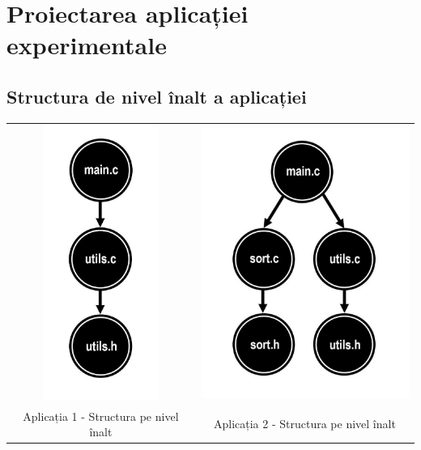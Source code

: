 \documentclass[11pt,a4paper]{article}
\begin{document}
\section{Proiectarea aplicației experimentale}

\subsection{Structura de nivel înalt a aplicației}
  \begin{center}
\begin{tabular}{ c c }
 \includegraphics[width=4cm, height=9cm]{algoritm_1.jpg} & \includegraphics[width=7cm, height=9cm]{algoritm_2.jpg}  \\ 
 Aplicația 1 - Structura pe nivel înalt & Aplicația 2 - Structura pe nivel înalt \\
\end{tabular}
\end{center}
  
\end{document}
